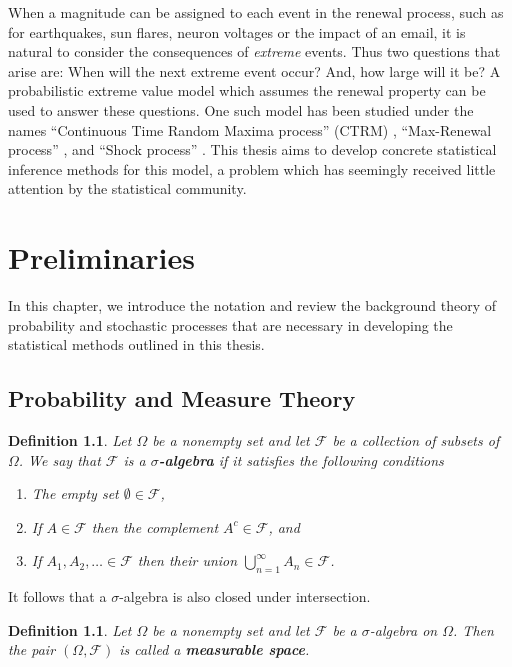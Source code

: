 \documentclass[honours,12pt,twoside, openright]{unswthesis}
\newcommand{\1}{\mathbf 1}
\newcommand{\FF}{\mathcal{F}}
\newtheorem{definition}[equation]{Definition}
\numberwithin{equation}{section}
\theoremstyle{definition}
\theoremstyle{remark}
\begin{document}
When a magnitude can be assigned to each event in the renewal process, 
such as for earthquakes, sun flares, neuron voltages or the impact of an email, it is natural to consider the consequences of \emph{extreme} events. Thus two questions that arise are: 
When will the next extreme event occur? And, how large will it be?
A probabilistic extreme value model which assumes the renewal property can be used to answer these questions. One such model has been studied under the names
``Continuous Time Random Maxima process'' (CTRM) 
\cite{Benson2007,Meerschaert2009,Hees16,Heesa}, 
``Max-Renewal process'' \cite{Silvestrov2002a,ST04,Basrak2014}, 
and ``Shock process'' 
\cite{Esary1973,Sumita1983,Sumita1984,Sumita1985,Anderson1987,Gut1999}.
This thesis aims to develop concrete statistical inference methods for this model, 
a problem which has seemingly received little attention by the statistical 
community.



\chapter{Preliminaries}\label{prelim}
In this chapter, we introduce the notation and review the background theory of probability and stochastic processes that are necessary in developing the statistical methods outlined in this thesis.
\section{Probability and Measure Theory}

\begin{definition}
Let $\Omega$ be a nonempty set and let $\FF$ be a collection of subsets of $\Omega$. We say that $\FF$ is a \textbf{$\sigma$-algebra} if it satisfies the following conditions
\begin{enumerate}
\item The empty set $\emptyset \in \FF$,
\item If $A\in \FF$ then the complement $A^c\in \FF$, and
\item If $A_1,A_2,\ldots \in \FF$ then their union $\bigcup_{n=1}^\infty A_n \in \FF$.
\end{enumerate}
\end{definition}
\noindent It follows that a $\sigma$-algebra is also closed under intersection.\\
\begin{definition}
Let $\Omega$ be a nonempty set and let $\FF$ be a $\sigma$-algebra on $\Omega$. Then the pair $(\Omega,\FF)$ is called a \textbf{measurable space}.\\
\end{definition}
\end{document}
